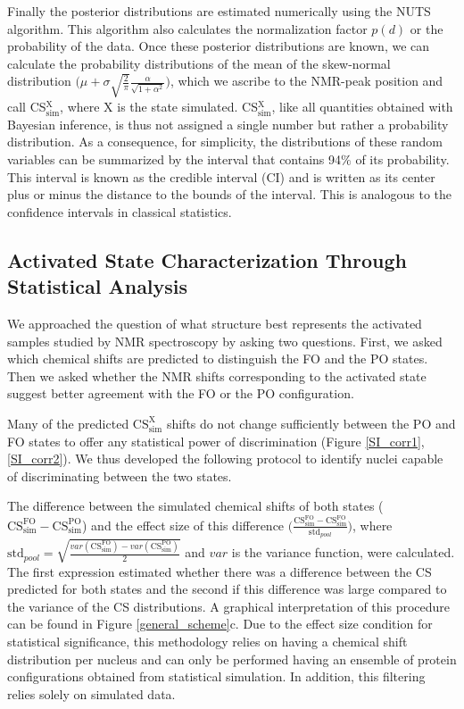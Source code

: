 \documentclass[%
 aip,
 amsmath,amssymb,
 preprint,%
]{revtex4-1}
\begin{document}
Finally the posterior distributions are estimated numerically using the NUTS\cite{sanjeevi2017nuts} algorithm. This algorithm also calculates the normalization factor $p(d)$ or the probability of the data. Once these posterior distributions are known, we can calculate the probability distributions of the mean of the skew-normal distribution $\big(\mu+\sigma\sqrt{\frac{2}{\pi}}\frac{\alpha}{\sqrt{1+\alpha^2}}\big)$, which we ascribe to the NMR-peak position and call CS$_{\text{sim}}^{\text{X}}$, where X is the state simulated. CS$_{\text{sim}}^{\text{X}}$, like all quantities obtained with Bayesian inference, is thus not assigned a single number but rather a probability distribution. As a consequence, for simplicity, the distributions of these random variables can be summarized by the interval that contains 94$\%$ of its probability. This interval is known as the credible interval (CI) and is written as its center plus or minus the distance to the bounds of the interval. This is analogous to the confidence intervals in classical statistics.

\subsection{Activated State Characterization Through Statistical Analysis}

We approached the question of what structure best represents the activated samples studied by NMR spectroscopy by asking two questions. First, we asked which chemical shifts are predicted to distinguish the FO and the PO states. Then we asked whether the NMR shifts corresponding to the activated state suggest better agreement with the FO or the PO configuration.

Many of the predicted ${\text{CS}}_{\text{sim}}^{\text{X}}$ shifts do not change sufficiently between the PO and FO states to offer any statistical power of discrimination (Figure \ref{SI_corr1}, \ref{SI_corr2}). We thus developed the following protocol to identify nuclei capable of discriminating between the two states.

The difference between the simulated chemical shifts of both states ($\text{CS}_{\text{sim}}^{\text{FO}}-\text{CS}_{\text{sim}}^{\text{PO}}$) and the effect size of this difference $\big(\frac{\text{CS}_{\text{sim}}^{\text{FO}}-\text{CS}_{\text{sim}}^{\text{FO}}}{\text{std}_{pool}}\big)$, where $\text{std}_{pool} =\sqrt{\frac{var(\text{CS}_{\text{sim}}^{\text{FO}})-var(\text{CS}_{\text{sim}}^{\text{PO}})}{2}}$ and $var$ is the variance function, were calculated. The first expression estimated whether there was a difference between the CS predicted for both states and the second if this difference was large compared to the variance of the CS distributions. A graphical interpretation of this procedure can be found in Figure \ref{general_scheme}c. Due to the effect size condition for statistical significance, this methodology relies on having a chemical shift distribution per nucleus and can only be performed having an ensemble of protein configurations obtained from statistical simulation. In addition, this filtering relies solely on simulated data.
\end{document}
